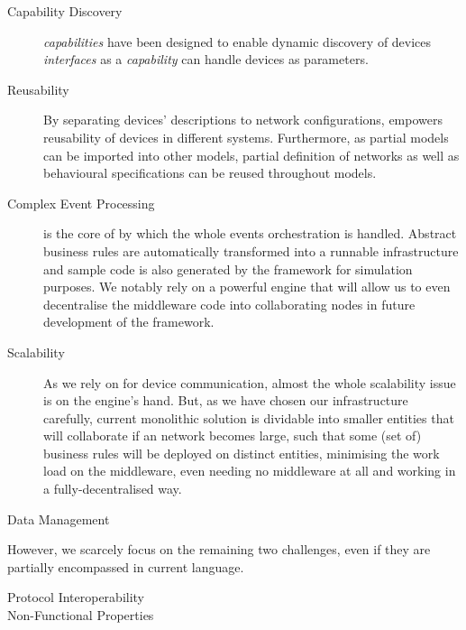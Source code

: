 \begin{description}
	\item[Capability Discovery] \IOTDSL \textsl{capabilities} have been designed to enable dynamic discovery of devices \textit{interfaces} as a \textsl{capability} can handle devices as parameters.
	
	\item[Reusability] By separating devices' descriptions to network configurations, \IOTDSL empowers reusability of devices in different \IOT systems. Furthermore, as partial \IOTDSL models can be imported into other models, partial definition of networks as well as behavioural specifications can be reused throughout models.
	
	\item[Complex Event Processing] \CEP is the core of \IOTDSL by which the whole events orchestration is handled. Abstract business rules are automatically transformed into a runnable infrastructure and sample code is also generated by the framework for simulation purposes. We notably rely on a powerful \CEP engine that will allow us to even decentralise the middleware code into collaborating nodes in future development of the framework.	
	
	\item[Scalability] As we rely on \CEP for device communication, almost the whole scalability issue is on the \CEP engine's hand. But, as we have chosen our infrastructure carefully, current monolithic solution is dividable into smaller entities that will collaborate if an \IOT network becomes large, such that some (set of) business rules will be deployed on distinct entities, minimising the work load on the middleware, even needing no middleware at all and working in a fully-decentralised way.
	
	\item[Data Management] 
	
\end{description}

However, we scarcely focus on the remaining two challenges, even if they are partially encompassed in current language.

\begin{description}
	\item[Protocol Interoperability]

	\item[Non-Functional Properties] 
\end{description}